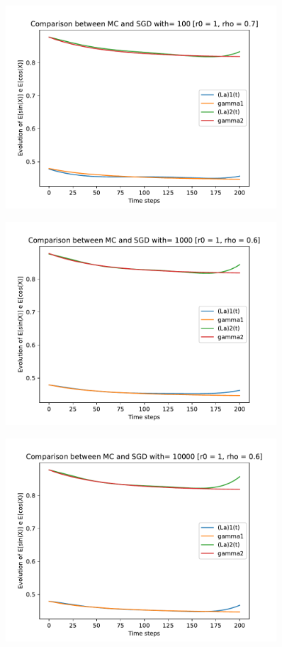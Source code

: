 \documentclass[a4paper,11pt,openright]{report}
\begin{document}
\begin{figure}[H]
\centering
\includegraphics[width=0.9\textwidth]{images/graphics T = 2/n = 5, M = 100 sine and cosine.pdf}
\end{figure}
\begin{figure}[H]
\centering
\includegraphics[width=0.9\textwidth]{images/graphics T = 2/n = 5, M = 1000 sine and cosine.pdf}
\end{figure}
\begin{figure}[H]
\centering
\includegraphics[width=0.9\textwidth]{images/graphics T = 2/n = 5, M = 10000 sine and cosine.pdf}
\end{figure}
\newpage
\end{document}
